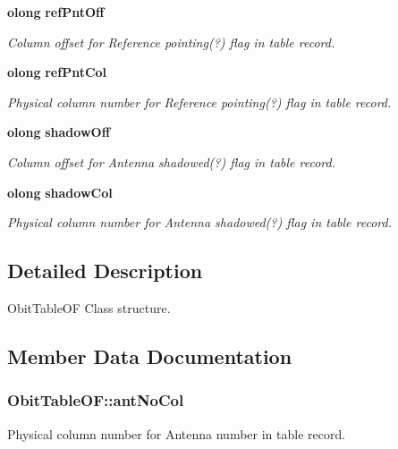 \begin{CompactItemize}
{\bf olong} {\bf ref\-Pnt\-Off}
\begin{CompactList}\small\item\em Column offset for Reference pointing(?) flag in table record. \item\end{CompactList}\item 
{\bf olong} {\bf ref\-Pnt\-Col}
\begin{CompactList}\small\item\em Physical column number for Reference pointing(?) flag in table record. \item\end{CompactList}\item 
{\bf olong} {\bf shadow\-Off}
\begin{CompactList}\small\item\em Column offset for Antenna shadowed(?) flag in table record. \item\end{CompactList}\item 
{\bf olong} {\bf shadow\-Col}
\begin{CompactList}\small\item\em Physical column number for Antenna shadowed(?) flag in table record. \item\end{CompactList}\end{CompactItemize}


\subsection{Detailed Description}
Obit\-Table\-OF Class structure. 



\subsection{Member Data Documentation}
\subsubsection{ {\bf Obit\-Table\-OF::ant\-No\-Col}}\label{structObitTableOF_o25}


Physical column number for Antenna number in table record. 

